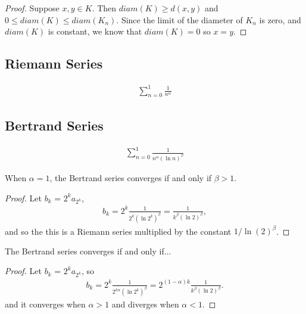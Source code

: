 \begin{proof}
    Suppose $x, y \in K$. Then $diam(K) \geq d(x, y)$ and $0 \leq diam(K) \leq diam(K_n)$. Since the limit of the diameter of $K_n$ is zero, and $diam(K)$ is constant, we know that $diam(K) = 0$ so $x = y$.
\end{proof}

\subsection{Riemann Series}
\begin{defn}
    \begin{align*}
        \sum_{n=0}^{1}\frac{1}{n^{\alpha}}
    \end{align*}
\end{defn}

\subsection{Bertrand Series}
\begin{defn}
    \begin{align*}
        \sum_{n=0}^{1}\frac{1}{n^{\alpha}\left(\ln n\right)^{\beta}}
    \end{align*}
\end{defn}

\begin{prop}
    When $\alpha=1$, the Bertrand series converges if and only if $\beta > 1$.
\end{prop}

\begin{proof}
    Let $b_k$ = $2^{k}a_{2^k}$,
    \begin{align*}
        b_k = 2^{k}\frac{1}{2^{k}(\ln 2^k)^{\beta}} = \frac{1}{k^{\beta}(\ln 2)^{\beta}},
    \end{align*}
    and so the this is a Riemann series multiplied by the constant $1/\ln(2)^{\beta}$.
\end{proof}

\begin{prop}
    The Bertrand series converges if and only if...
\end{prop}

\begin{proof}
    Let $b_k$ = $2^{k}a_{2^k}$, so
    \begin{align*}
        b_k = 2^{k}\frac{1}{2^{k\alpha}(\ln 2^k)^{\beta}} = 2^{(1-\alpha)k}\frac{1}{k^{\beta}(\ln 2)^{\beta}}.
    \end{align*}
    and it converges when $\alpha > 1$ and diverges when $\alpha < 1$.
\end{proof}

